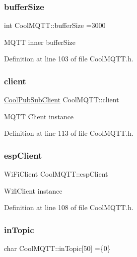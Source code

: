 \subsubsection{\texorpdfstring{buffer\+Size}{bufferSize}}
{\footnotesize\ttfamily int Cool\+M\+Q\+T\+T\+::buffer\+Size =3000\hspace{0.3cm}{\ttfamily [private]}}

M\+Q\+TT inner buffer\+Size 

Definition at line 103 of file Cool\+M\+Q\+T\+T.\+h.

\mbox{\label{class_cool_m_q_t_t_afed1372683c44893b4668d0f1771f514}} 
\subsubsection{\texorpdfstring{client}{client}}
{\footnotesize\ttfamily \hyperlink{class_cool_pub_sub_client}{Cool\+Pub\+Sub\+Client} Cool\+M\+Q\+T\+T\+::client\hspace{0.3cm}{\ttfamily [private]}}

M\+Q\+TT Client instance 

Definition at line 113 of file Cool\+M\+Q\+T\+T.\+h.

\mbox{\label{class_cool_m_q_t_t_acc30a0200967374a524092a8a806502a}} 
\subsubsection{\texorpdfstring{esp\+Client}{espClient}}
{\footnotesize\ttfamily Wi\+Fi\+Client Cool\+M\+Q\+T\+T\+::esp\+Client\hspace{0.3cm}{\ttfamily [private]}}

Wifi\+Client instance 

Definition at line 108 of file Cool\+M\+Q\+T\+T.\+h.

\mbox{\label{class_cool_m_q_t_t_a4492f52a441e83cc5151010317fdb52d}} 
\subsubsection{\texorpdfstring{in\+Topic}{inTopic}}
{\footnotesize\ttfamily char Cool\+M\+Q\+T\+T\+::in\+Topic\mbox{[}50\mbox{]} =\{\textquotesingle{}0\textquotesingle{}\}\hspace{0.3cm}{\ttfamily [private]}}

